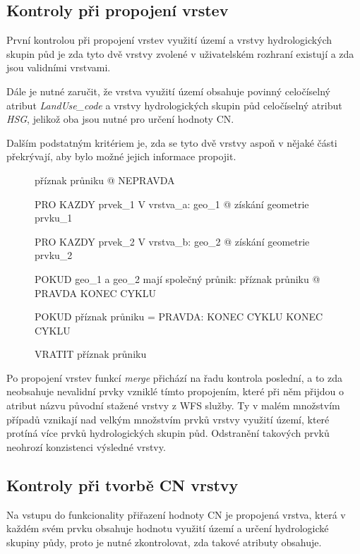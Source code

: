 \documentclass[a4paper,oneside,12pt]{book}
\begin{document}
\subsection{Kontroly při propojení vrstev} \label{intersection_checks}
\hspace{10mm}  První kontrolou při propojení vrstev využití území a vrstvy hydrologických skupin půd je zda tyto dvě vrstvy zvolené v uživatelském rozhraní existují a zda jsou validními vrstvami.

\hspace{10mm} Dále je nutné zaručit, že vrstva využití území obsahuje povinný celočíselný atribut \textit{LandUse\_code} a vrstvy hydrologických skupin půd  celočíselný atribut \textit{HSG}, jelikož oba jsou nutné pro určení hodnoty CN.

\hspace{10mm} Dalším podstatným kritériem je, zda se tyto dvě vrstvy aspoň v nějaké části překrývají, aby bylo možné jejich informace propojit.

\begin{figure}[H]
\begin{pseudocode}[style=mypseudocode, caption={Ukázka kontroly překrytí obou vrstev},label={kod:overlap_check}]
příznak průniku @ NEPRAVDA

PRO KAZDY prvek_1 V vrstva_a:
    geo_1 @ získání geometrie prvku_1

    PRO KAZDY prvek_2 V vrstva_b:
        geo_2 @ získání geometrie prvku_2
        
        POKUD geo_1 a geo_2 mají společný průnik:
            příznak průniku @  PRAVDA
            KONEC CYKLU

    POKUD příznak průniku = PRAVDA:
        KONEC CYKLU
KONEC CYKLU

VRATIT příznak průniku 


\end{pseudocode}
\end{figure}

\hspace{10mm} Po propojení vrstev funkcí \textit{merge} přichází na řadu kontrola poslední, a to zda neobsahuje nevalidní prvky vzniklé tímto propojením, které při něm přijdou o atribut názvu původní stažené vrstvy z WFS služby. Ty v malém množstvím případů vznikají nad velkým množstvím prvků vrstvy využití území, které protíná více prvků hydrologických skupin půd. Odstranění takových prvků neohrozí konzistenci výsledné vrstvy.

\subsection{Kontroly při tvorbě CN vrstvy} \label{CN_checks}
\hspace{10mm} Na vstupu do funkcionality přiřazení hodnoty CN je propojená vrstva, která v každém svém prvku obsahuje hodnotu využití území a určení hydrologické skupiny půdy, proto je nutné zkontrolovat, zda takové atributy obsahuje.
\end{document}
